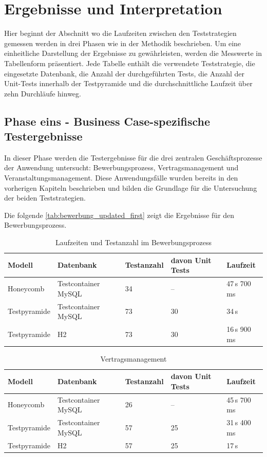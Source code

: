 \section{Ergebnisse und Interpretation}
Hier beginnt der Abschnitt wo die Laufzeiten zwischen den Teststrategien gemessen werden in drei Phasen wie in der Methodik beschrieben. Um eine einheitliche Darstellung der Ergebnisse zu gewährleisten, werden die Messwerte in Tabellenform präsentiert. Jede Tabelle enthält die verwendete Teststrategie, die eingesetzte Datenbank, die Anzahl der durchgeführten Tests, die Anzahl der Unit-Tests innerhalb der Testpyramide und die durchschnittliche Laufzeit über zehn Durchläufe hinweg. 
\subsection{Phase eins - Business Case-spezifische Testergebnisse}
In dieser Phase werden die Testergebnisse für die drei zentralen Geschäftsprozesse der Anwendung untersucht: Bewerbungsprozess, Vertragsmanagement und Veranstaltungsmanagement. Diese Anwendungsfälle wurden bereits in den vorherigen Kapiteln beschrieben und bilden die Grundlage für die Untersuchung der beiden Teststrategien.


Die folgende \autoref{tab:bewerbung_updated_first} zeigt die Ergebnisse für den Bewerbungsprozess.
\begin{table}[H]
	\centering
	\begin{tabular}{|l|l|l|l|l|}
		\hline
		\textbf{Modell} & \textbf{Datenbank} & \textbf{Testanzahl} & \textbf{davon Unit Tests} & \textbf{Laufzeit} \\
		\hline
		Honeycomb       & Testcontainer MySQL & 34  & --  & 47\,s 700\,ms    \\
		\hline
		Testpyramide    & Testcontainer MySQL & 73  & 30  & 34\,s   \\
		\hline
		Testpyramide    & H2                  & 73  & 30  & 16\,s 900\,ms   \\
		\hline
	\end{tabular}
	\caption{Laufzeiten und Testanzahl im Bewerbungsprozess}
	\label{tab:bewerbung_updated_first}
\end{table}


\begin{table}[H]
	\centering
	\begin{tabular}{|l|l|l|l|l|}
		\hline
		\textbf{Modell} & \textbf{Datenbank} & \textbf{Testanzahl} & \textbf{davon Unit Tests} & \textbf{Laufzeit} \\
		\hline
		Honeycomb      & Testcontainer MySQL & 26  & --  & 45\,s 700\,ms   \\
		\hline
		Testpyramide   & Testcontainer MySQL & 57  & 25  &31\,s 400\,ms    \\
		\hline
		Testpyramide   & H2                  & 57  & 25  & 17\,s   \\
		\hline
	\end{tabular}
	\caption{Vertragsmanagement}
	\label{tab:vertrag_einzeln}
\end{table}


